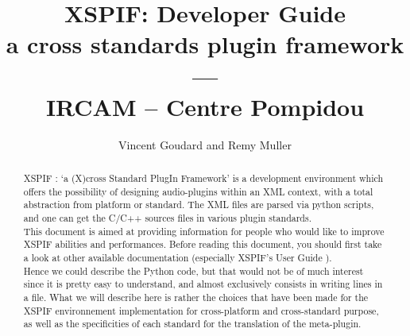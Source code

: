 \documentclass[12pt,a4paper]{report}
\title{\textbf{XSPIF: Developer Guide}\\
\large a cross standards plugin framework\\
---\\
IRCAM -- Centre Pompidou \\}
\author{Vincent Goudard and Remy Muller}
\newif\ifpdf
\begin{document}
\ifpdf
\DeclareGraphicsExtensions{.pdf, .jpg, .tif}
\else
{}
\fi

\maketitle


\cleardoublepage
\begin{abstract}
XSPIF : `a (X)cross Standard PlugIn Framework' is a development environment which offers the possibility of designing audio-plugins within an XML context, with a total abstraction from platform or standard.
The XML files are parsed via python scripts, and one can get the C/C++ sources files in various plugin standards.\\

\noindent This document is aimed at providing information for people who would like to improve XSPIF abilities and performances. Before reading this document, you should first take a look at other available documentation (especially XSPIF's User Guide \cite{xspif:userguide}).\\
\noindent  Hence we could describe the Python code, but that would not be of much interest since it is pretty easy to understand, and almost exclusively consists in writing lines in a file. What we will describe here is rather the choices that have been made for the XSPIF environnement implementation for cross-platform and cross-standard purpose, as well as the specificities of each standard for the translation of the meta-plugin.
\end{abstract}


\cleardoublepage

\tableofcontents








\cleardoublepage


\end{document}
